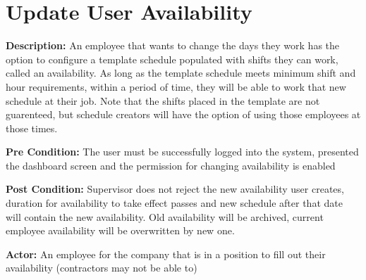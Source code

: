 \documentclass[letterpaper,12pt]{report}
\begin{document}
\section{Update User Availability}
\begin{description}
 \item \textbf{Description:} \newline An employee that wants to change the days they work has the option to configure a template schedule populated with shifts they can work, called an availability. As long as the template schedule meets minimum shift and hour requirements, within a period of time, they will be able to work that new schedule at their job. Note that the shifts placed in the template are not guarenteed, but schedule creators will have the option of using those employees at those times.
 \item \textbf{Pre Condition:} \newline The user must be successfully logged into the system, presented the dashboard screen and the permission for changing availability is enabled
 \item \textbf{Post Condition:} \newline Supervisor does not reject the new availability user creates, duration for availability to take effect passes and new schedule after that date will contain the new availability. Old availability will be archived, current employee availability will be overwritten by new one.
 \item \textbf{Actor:} \newline An employee for the company that is in a position to fill out their availability (contractors may not be able to)
\end{description}
\end{document}
